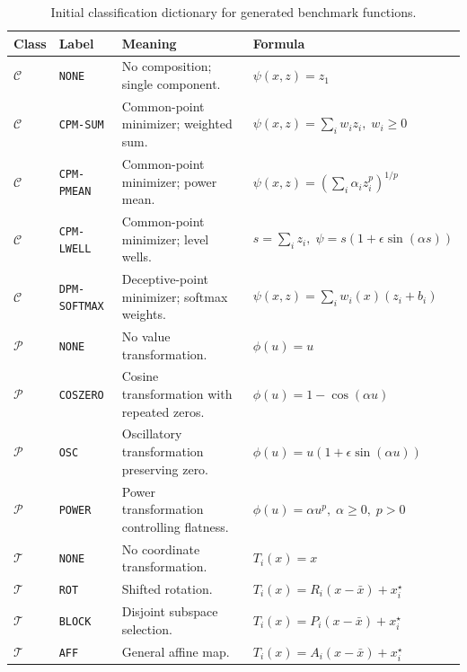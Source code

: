 \documentclass[journal]{IEEEtran}
\theoremstyle{remark}
\theoremstyle{plain}
\begin{document}
\begin{table}[t]
	\centering
	\scriptsize
	\caption{Initial classification dictionary for generated benchmark functions.}
	\label{tab:classification-dictionary}
	\begin{tabular}{@{}p{}p{}p{}p{}@{}}
		\hline
		Class & Label & Meaning & Formula \\
		\hline
		\(\mathcal{C}\) & \texttt{NONE} &
		No composition; single component. &
		\(\psi(x,z)=z_1\) \\
		\(\mathcal{C}\) & \texttt{CPM-SUM} &
		Common-point minimizer; weighted sum. &
		\(\psi(x,z)=\sum_i w_i z_i,\; w_i\ge0\) \\
		\(\mathcal{C}\) & \texttt{CPM-PMEAN} &
		Common-point minimizer; power mean. &
		\(\psi(x,z)=\left(\sum_i \alpha_i z_i^p\right)^{1/p}\) \\
		\(\mathcal{C}\) & \texttt{CPM-LWELL} &
		Common-point minimizer; level wells. &
		\(s=\sum_i z_i,\;\psi=s(1+\epsilon\sin(\alpha s))\) \\
		\(\mathcal{C}\) & \texttt{DPM-SOFTMAX} &
		Deceptive-point minimizer; softmax weights. &
		\(\psi(x,z)=\sum_i w_i(x)(z_i+b_i)\) \\
		\hline
		\(\mathcal{P}\) & \texttt{NONE} &
		No value transformation. &
		\(\phi(u)=u\) \\
		\(\mathcal{P}\) & \texttt{COSZERO} &
		Cosine transformation with repeated zeros. &
		\(\phi(u)=1-\cos(\alpha u)\) \\
		\(\mathcal{P}\) & \texttt{OSC} &
		Oscillatory transformation preserving zero. &
		\(\phi(u)=u(1+\epsilon\sin(\alpha u))\) \\
		\(\mathcal{P}\) & \texttt{POWER} &
		Power transformation controlling flatness. &
		\(\phi(u)=\alpha u^p,\; \alpha\ge0,\;p>0\) \\
		\hline
		\(\mathcal{T}\) & \texttt{NONE} &
		No coordinate transformation. &
		\(T_i(x)=x\) \\
		\(\mathcal{T}\) & \texttt{ROT} &
		Shifted rotation. &
		\(T_i(x)=R_i(x-\bar x)+x_i^\star\) \\
		\(\mathcal{T}\) & \texttt{BLOCK} &
		Disjoint subspace selection. &
		\(T_i(x)=P_i(x-\bar x)+x_i^\star\) \\
		\(\mathcal{T}\) & \texttt{AFF} &
		General affine map. &
		\(T_i(x)=A_i(x-\bar{x})+x_i^\star\) \\
		\hline
	\end{tabular}
\end{table}
\end{document}
